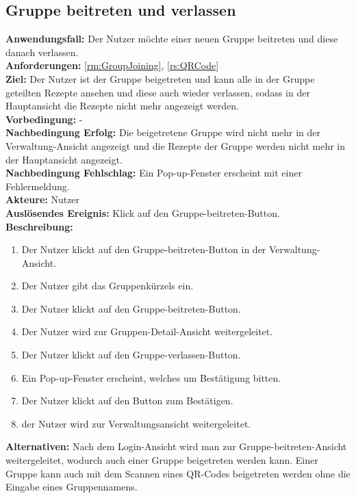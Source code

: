 \documentclass[parskip=full]{scrartcl}
\begin{document}
\subsection{Gruppe beitreten und verlassen}
\textbf{Anwendungsfall:} Der Nutzer möchte einer neuen Gruppe beitreten und diese danach verlassen.\\
\textbf{Anforderungen:} \ref{rm:GroupJoining}, \ref{rs:QRCode} \\
\textbf{Ziel:} Der Nutzer ist der Gruppe beigetreten und kann alle in der Gruppe geteilten Rezepte ansehen und diese auch wieder verlassen, sodass in der Hauptansicht die Rezepte nicht mehr angezeigt werden.\\
\textbf{Vorbedingung:} -\\
\textbf{Nachbedingung Erfolg:} Die beigetretene Gruppe wird nicht mehr in der Verwaltung-Ansicht angezeigt und die Rezepte der Gruppe werden nicht mehr in der Hauptansicht angezeigt.\\
\textbf{Nachbedingung Fehlschlag:} Ein Pop-up-Fenster erscheint mit einer Fehlermeldung.\\
\textbf{Akteure:} Nutzer\\
\textbf{Auslösendes Ereignis:} Klick auf den Gruppe-beitreten-Button.\\
\textbf{Beschreibung:}\\
\begin{enumerate}
    \item Der Nutzer klickt auf den Gruppe-beitreten-Button in der Verwaltung-Ansicht.
    \item Der Nutzer gibt das Gruppenkürzels ein.
    \item Der Nutzer klickt auf den Gruppe-beitreten-Button.
    \item Der Nutzer wird zur Gruppen-Detail-Ansicht weitergeleitet.
    \item Der Nutzer klickt auf den Gruppe-verlassen-Button.
    \item Ein Pop-up-Fenster erscheint, welches um Bestätigung bitten.
    \item Der Nutzer klickt auf den Button zum Bestätigen.
    \item der Nutzer wird zur Verwaltungsansicht weitergeleitet.
\end{enumerate}
\textbf{Alternativen:} Nach dem Login-Ansicht wird man zur Gruppe-beitreten-Ansicht weitergeleitet, wodurch auch einer Gruppe beigetreten werden kann. Einer Gruppe kann auch mit dem Scannen eines QR-Codes beigetreten werden ohne die Eingabe eines Gruppennamens.
\newpage
\end{document}
